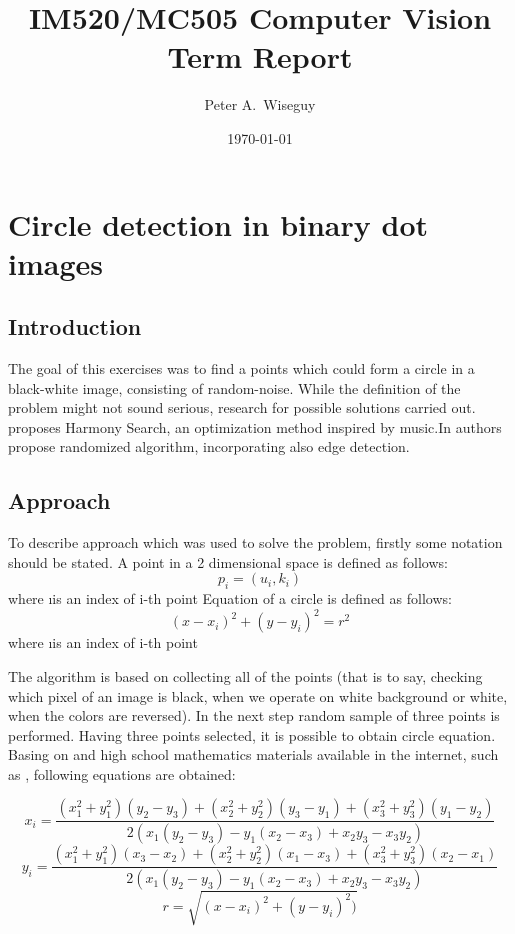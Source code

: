 \documentclass[notitlepage,english]{hgbreport}
\author{Peter A.\ Wiseguy}
\title{IM520/MC505 Computer Vision\\ %
			Term Report}
\date{\today}
\begin{document}




\chapter{Circle detection in binary dot images}


\section {Introduction}
The goal of this exercises was to find a points which could form a circle in a black-white image, consisting of random-noise. While the definition of the problem might not sound serious, research for possible solutions carried out.\cite{fourie2017robust} proposes Harmony Search, an optimization method inspired by music.In \cite{alomari2013randomized} authors propose randomized algorithm, incorporating also edge detection.


\section {Approach}

To describe approach which was used to solve the problem, firstly some notation should be stated. A point in a 2 dimensional space is defined as follows:
\[p_{i}=(u_{i},k_{i})\]
where \i is an index of i-th point
Equation of a circle is defined as follows:
\[(x-x_{i})^2+(y-y_{i})^2=r^2\]
where \i is an index of i-th point


The algorithm is based on collecting all of the points (that is to say, checking which pixel of an image is black, when we operate on white background or white, when the colors are reversed). In the next step random sample of three points is performed. Having three points selected,  it is possible to obtain circle equation. Basing on \cite{wiki:Circles} and high school mathematics materials available in the internet, such as \cite{eisle}, following equations are obtained:

\[x_{i}=\frac{(x_{1}^2+y_{1}^2)(y_{2}-y_{3})+(x_{2}^2+y_{2}^2)(y_{3}-y_{1})+(x_{3}^2+y_{3}^2)(y_{1}-y_{2})}{2(x_{1}(y_{2}-y_{3})-y_{1}(x_{2}-x_{3})+x_{2}y_{3}-x_{3}y_{2})}\]
\[y_{i}=\frac{(x_{1}^2+y_{1}^2)(x_{3}-x_{2})+(x_{2}^2+y_{2}^2)(x_{1}-x_{3})+(x_{3}^2+y_{3}^2)(x_{2}-x_{1})} {2(x_{1}(y_{2}-y_{3})-y_{1}(x_{2}-x_{3})+x_{2}y_{3}-x_{3}y_{2})}\]
\[r=\sqrt{(x-x_{i})^2+(y-y_{i})^2)}\]
\end{document}
